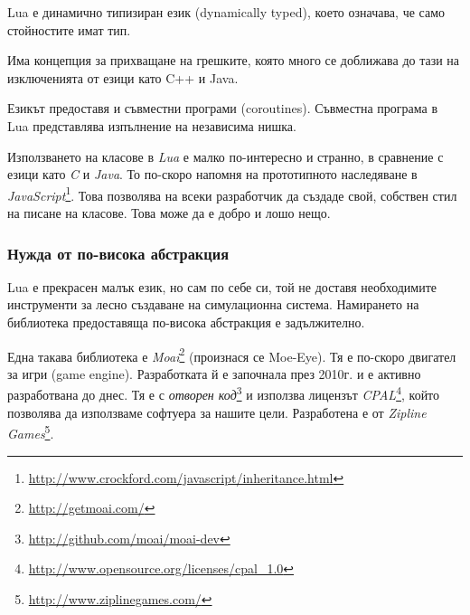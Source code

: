 				Lua е динамично типизиран език (dynamically typed), което означава, че само стойностите имат тип.
				
								
				
				
				Има концепция за прихващане на грешките, която много се доближава до тази на изключенията от езици като
				C++ и Java.
				
				
				
				
				\newpage
				
				Езикът предоставя и съвместни програми (coroutines). Съвместна програма в Lua представлява изпълнение на независима нишка.
				
				
				
				
				
				\newpage
				
				Използването на класове в \emph{Lua} е малко по-интересно и странно, в сравнение с езици като \emph{C} и \emph{Java}. 
				То по-скоро напомня на прототипното наследяване в
				\emph{JavaScript}\footnote{\url{http://www.crockford.com/javascript/inheritance.html}}.
				Това позволява на всеки разработчик да създаде свой, собствен стил на писане на класове. Това може да е добро и лошо нещо.
				
				
				
								
		
		\subsubsection{Нужда от по-висока абстракция}
		
			Lua е прекрасен малък език, но сам по себе си, той не доставя необходимите инструменти
			за лесно създаване на симулационна система. Намирането на библиотека предоставяща по-висока
			абстракция е задължително.
			
			Една такава библиотека е \emph{Moai}\footnote{\url{http://getmoai.com/}} (произнася се Moe-Eye).
			Тя е по-скоро двигател за игри (game engine).
			Разработката й е започнала през 2010г. и е активно разработвана до днес. 
			Тя е с \emph{отворен код}\footnote{\url{http://github.com/moai/moai-dev}}
			и използва лицензът \emph{CPAL}\footnote{\url{http://www.opensource.org/licenses/cpal_1.0}}, който
			позволява да използваме софтуера за нашите цели. 
			Разработена е от \emph{Zipline Games}\footnote{\url{http://www.ziplinegames.com/}}.						
			
